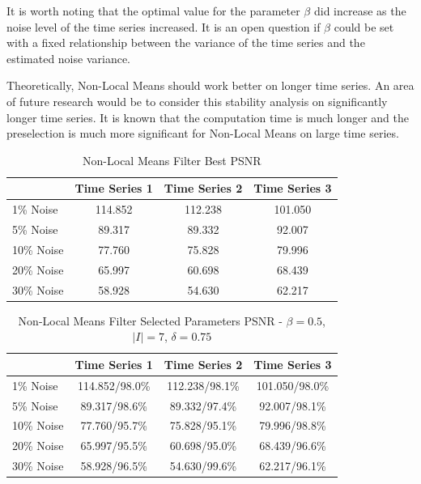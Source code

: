 \documentclass[11pt]{article}
\theoremstyle{definition}
\begin{document}
It is worth noting that the optimal value for the parameter $\beta$ did increase as the noise level of the time series increased. It is an open question if $\beta$ could be set with a fixed relationship between the variance of the time series and the estimated noise variance.

Theoretically, Non-Local Means should work better on longer time series. An area of future research would be to consider this stability analysis on significantly longer time series. It is known that the computation time is much longer and the preselection is much more significant for Non-Local Means on large time series.

\begin{table}[!h]
\small
\begin{center}
\begin{tabular}{l | c | c | c}
 & Time Series 1 & Time Series 2 & Time Series 3 \\ \hline
1\% Noise & 114.852 & 112.238 & 101.050 \\ \hline
5\% Noise & 89.317 & 89.332 & 92.007 \\ \hline
10\% Noise & 77.760 & 75.828 & 79.996 \\ \hline
20\% Noise & 65.997 & 60.698 & 68.439 \\ \hline
30\% Noise & 58.928 & 54.630 & 62.217
\end{tabular}
\caption{Non-Local Means Filter Best PSNR}
\label{nlmeansbestpsnr}
\end{center}
\end{table}

\begin{table}[!h]
\small
\begin{center}
\begin{tabular}{l | c | c | c}
 & Time Series 1 & Time Series 2 & Time Series 3 \\ \hline
1\% Noise & 114.852/98.0\% & 112.238/98.1\% & 101.050/98.0\% \\ \hline
5\% Noise & 89.317/98.6\% & 89.332/97.4\% & 92.007/98.1\% \\ \hline
10\% Noise & 77.760/95.7\% & 75.828/95.1\% & 79.996/98.8\% \\ \hline
20\% Noise & 65.997/95.5\% & 60.698/95.0\% & 68.439/96.6\% \\ \hline
30\% Noise & 58.928/96.5\% & 54.630/99.6\% & 62.217/96.1\%
\end{tabular}
\caption{Non-Local Means Filter Selected Parameters PSNR - $\beta = 0.5$, $\lvert I \rvert = 7$, $\delta = 0.75$}
\label{nlmeansselectpsnr}
\end{center}
\end{table}
\end{document}
